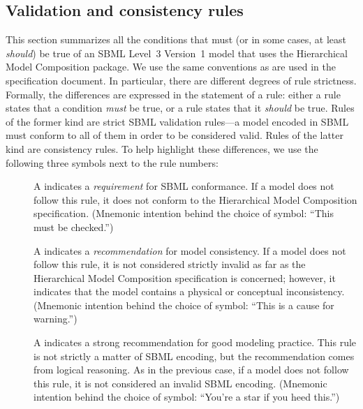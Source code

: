 \subsection{Validation and consistency rules}
\label{validation-rules}

This section summarizes all the conditions that must (or in some cases, at least \emph{should}) be true of an SBML Level~3 Version~1 model that uses the Hierarchical Model Composition package. We use the same conventions as are used in the \sbmlthreecore specification document. In particular, there are different degrees of rule strictness. Formally, the differences are expressed in the statement of a rule: either a rule states that a condition \emph{must} be true, or a rule states that it \emph{should} be true. Rules of the former kind are strict SBML validation rules---a model encoded in SBML must conform to all of them in order to be considered valid. Rules of the latter kind are consistency rules. To help highlight these differences, we use the following three symbols next to the rule numbers:

\begin{description}

\item[\hspace*{6.5pt}\vSymbol\vsp] A \vSymbolName indicates a \emph{requirement} for SBML conformance. If a model does not follow this rule, it does not conform to the Hierarchical Model Composition specification. (Mnemonic intention behind the choice of symbol: ``This must be checked.'')

\item[\hspace*{6.5pt}\cSymbol\csp] A \cSymbolName indicates a \emph{recommendation} for model consistency. If a model does not follow this rule, it is not considered strictly invalid as far as the Hierarchical Model Composition specification is concerned; however, it indicates that the model contains a physical or conceptual inconsistency. (Mnemonic intention behind the choice of symbol: ``This is a cause for warning.'')

\item[\hspace*{6.5pt}\mSymbol\msp] A \mSymbolName indicates a strong recommendation for good modeling practice. This rule is not strictly a matter of SBML encoding, but the recommendation comes from logical reasoning. As in the previous case, if a model does not follow this rule, it is not considered an invalid SBML encoding. (Mnemonic intention behind the choice of symbol: ``You're a star if you heed this.'')

\end{description}

